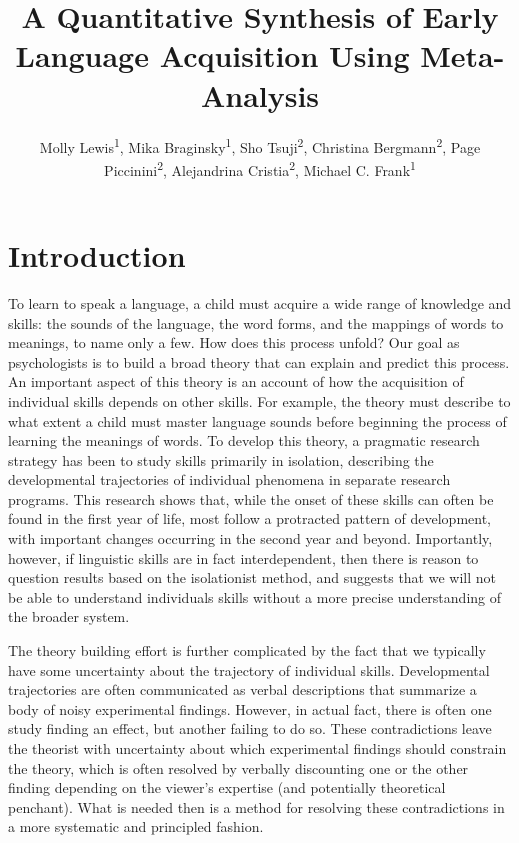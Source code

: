 \documentclass[english,floatsintext,man]{apa6}
\title{A Quantitative Synthesis of Early Language Acquisition Using
Meta-Analysis}
\author{
          Molly Lewis\textsuperscript{1},
          Mika Braginsky\textsuperscript{1},
          Sho Tsuji\textsuperscript{2},
          Christina Bergmann\textsuperscript{2},
          Page Piccinini\textsuperscript{2},
          Alejandrina Cristia\textsuperscript{2},
          Michael C. Frank\textsuperscript{1}  }
\affiliation{
    \vspace{0.5cm}
          \textsuperscript{1} Department Psychology, Stanford University\\
          \textsuperscript{2} Laboratoire de Sciences Cognitives et Psycholinguistique, ENS  }
\begin{document}
\maketitle



\section{Introduction}\label{introduction}

To learn to speak a language, a child must acquire a wide range of
knowledge and skills: the sounds of the language, the word forms, and
the mappings of words to meanings, to name only a few. How does this
process unfold? Our goal as psychologists is to build a broad theory
that can explain and predict this process. An important aspect of this
theory is an account of how the acquisition of individual skills depends
on other skills. For example, the theory must describe to what extent a
child must master language sounds before beginning the process of
learning the meanings of words. To develop this theory, a pragmatic
research strategy has been to study skills primarily in isolation,
describing the developmental trajectories of individual phenomena in
separate research programs. This research shows that, while the onset of
these skills can often be found in the first year of life, most follow a
protracted pattern of development, with important changes occurring in
the second year and beyond. Importantly, however, if linguistic skills
are in fact interdependent, then there is reason to question results
based on the isolationist method, and suggests that we will not be able
to understand individuals skills without a more precise understanding of
the broader system.

The theory building effort is further complicated by the fact that we
typically have some uncertainty about the trajectory of individual
skills. Developmental trajectories are often communicated as verbal
descriptions that summarize a body of noisy experimental findings.
However, in actual fact, there is often one study finding an effect, but
another failing to do so. These contradictions leave the theorist with
uncertainty about which experimental findings should constrain the
theory, which is often resolved by verbally discounting one or the other
finding depending on the viewer's expertise (and potentially theoretical
penchant). What is needed then is a method for resolving these
contradictions in a more systematic and principled fashion.
\end{document}

